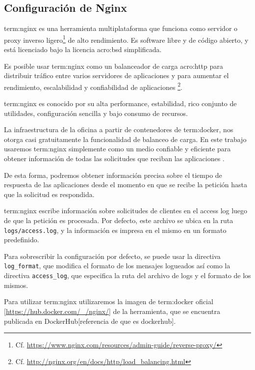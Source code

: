 \subsection{Configuración de Nginx} \label{configuracion_de_nginx}

\gls{term:nginx} es una herramienta multiplataforma que funciona como servidor
 o proxy inverso ligero\footnote{Cf.
\url{https://www.nginx.com/resources/admin-guide/reverse-proxy/}} de alto
rendimiento. Es software libre y de código abierto, y está licenciado bajo la
licencia \gls{acro:bsd} simplificada.

Es posible usar \gls{term:nginx} como un balanceador de carga \gls{acro:http}
para distribuir tráfico entre varios servidores de aplicaciones y para aumentar
el rendimiento, escalabilidad y confiabilidad de aplicaciones
 \footnote{Cf.
\url{http://nginx.org/en/docs/http/load_balancing.html}}.

\gls{term:nginx} es conocido por su alta performance, estabilidad, rico
conjunto de utilidades, configuración sencilla y bajo consumo de recursos.

La infraestructura de la oficina a partir de contenedores de \gls{term:docker},
nos otorga casi gratuitamente la funcionalidad de balanceo de carga. En este
trabajo usaremos \gls{term:nginx} simplemente como un medio confiable y
eficiente para obtener información de todas las solicitudes que reciban las
aplicaciones .

De esta forma, podremos obtener información precisa sobre el tiempo de
respuesta de las aplicaciones desde el momento en que se recibe la petición
hasta que la solicitud es respondida.

\gls{term:nginx} escribe información sobre solicitudes de clientes en el access
log luego de que la petición  es procesada. Por defecto, este
archivo se ubica en la ruta \texttt{logs/access.log}, y la información es
impresa en el mismo en un formato predefinido.

Para sobrescribir la configuración por defecto, se puede usar la directiva
\texttt{log\_format}, que modifica el formato de los mensajes logueados así
como la directiva \texttt{access\_log}, que especifica la ruta del archivo de
logs y el formato de los mismos.

Para utilizar \gls{term:nginx} utilizaremos la imagen de \gls{term:docker}
oficial [\url{https://hub.docker.com/_/nginx/}] de la herramienta, que se
encuentra publicada en DockerHub[referencia de que es dockerhub].

